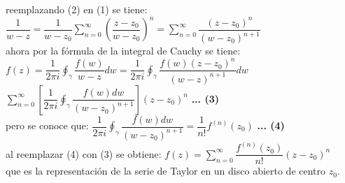 \documentclass[10pt,a4paper]{article}
\begin{document}
reemplazando (2) en (1) se tiene: $\displaystyle{\dfrac{1}{w-z}= \dfrac{1}{w-z_0}\sum_{n=0}^{\infty} (\dfrac{z - z_0}{w - z_0})^n = \sum_{n=0}^{\infty} \dfrac{(z - z_0)^n}{(w - z_0)^{n+1}}}$ \\ ahora por la fórmula de la integral de Cauchy se tiene: \\
$\displaystyle{f(z) = \dfrac{1}{2 \pi i} \oint_\gamma \dfrac{f(w)}{w-z} dw = \dfrac{1}{2 \pi i} \oint_\gamma \dfrac{f(w)(z-z_0)^n}{(w-z)^{n+1}} dw }$\\
$\displaystyle{\sum_{n=0}^{\infty} [ \dfrac{1}{2 \pi i} \oint_\gamma \dfrac{f(w) dw}{(w-z_0)^{n+1}}] (z-z_0)^n}$ \textbf{... (3)}\\
pero se conoce que: $\displaystyle{\dfrac{1}{2 \pi i} \oint_\gamma \dfrac{f(w) dw}{(w-z_0)^{n+1}} = \dfrac{1}{n!} f^{(n)}(z_0)}$ \textbf{... (4)}\\
al reemplazar (4) con (3) se obtiene: $\displaystyle{f(z) = \sum_{n = 0}^{\infty} \dfrac{f^{(n)} (z_0)}{n!} (z-z_0)^n}$\\
que es la representación de la serie de Taylor en un disco abierto de centro $z_0$.
\end{document}
